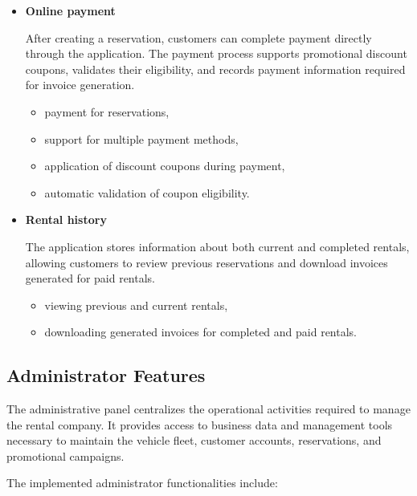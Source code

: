 \begin{itemize}
    \item \textbf{Online payment}

    After creating a reservation, customers can complete payment directly through the application. The payment process supports promotional discount coupons, validates their eligibility, and records payment information required for invoice generation.

    \begin{itemize}
        \item payment for reservations,
        \item support for multiple payment methods,
        \item application of discount coupons during payment,
        \item automatic validation of coupon eligibility.
    \end{itemize}

    \item \textbf{Rental history}

    The application stores information about both current and completed rentals, allowing customers to review previous reservations and download invoices generated for paid rentals.

    \begin{itemize}
        \item viewing previous and current rentals,
        \item downloading generated invoices for completed and paid rentals.
    \end{itemize}

\end{itemize}

\subsection{Administrator Features}

The administrative panel centralizes the operational activities required to manage the rental company. It provides access to business data and management tools necessary to maintain the vehicle fleet, customer accounts, reservations, and promotional campaigns.

The implemented administrator functionalities include:

